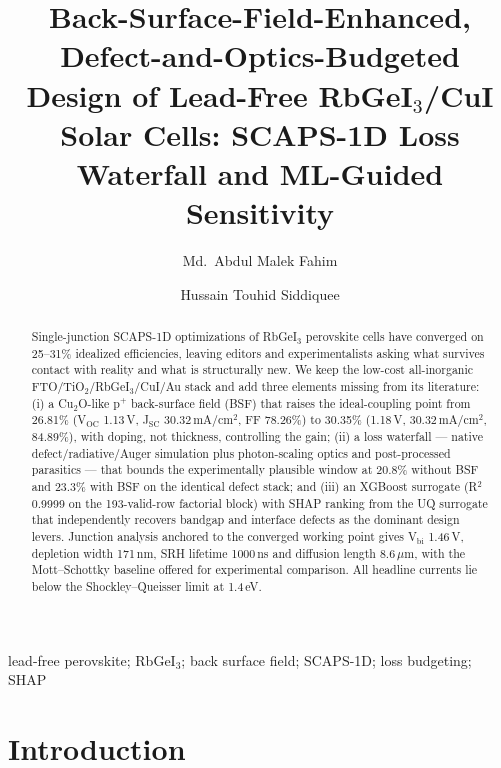 \documentclass[review]{elsarticle}
\begin{document}
\begin{frontmatter}
\title{Back-Surface-Field-Enhanced, Defect-and-Optics-Budgeted Design of Lead-Free RbGeI$_{3}$/CuI Solar Cells: SCAPS-1D Loss Waterfall and ML-Guided Sensitivity}
\author[lus]{Md.\ Abdul Malek Fahim}
\author[lus]{Hussain Touhid Siddiquee}
\address[lus]{Department of Electrical and Electronic Engineering, Leading University, Sylhet, Bangladesh}
\begin{abstract}
Single-junction SCAPS-1D optimizations of RbGeI$_{3}$ perovskite cells have converged on 25--31\% idealized efficiencies, leaving editors and experimentalists asking what survives contact with reality and what is structurally new. We keep the low-cost all-inorganic FTO/TiO$_{2}$/RbGeI$_{3}$/CuI/Au stack and add three elements missing from its literature: (i) a Cu$_{2}$O-like p$^{+}$ back-surface field (BSF) that raises the ideal-coupling point from 26.81\% (V$_{\mathrm{OC}}$ 1.13\,V, J$_{\mathrm{SC}}$ 30.32\,mA/cm$^{2}$, FF 78.26\%) to 30.35\% (1.18\,V, 30.32\,mA/cm$^{2}$, 84.89\%), with doping, not thickness, controlling the gain; (ii) a loss waterfall --- native defect/radiative/Auger simulation plus photon-scaling optics and post-processed parasitics --- that bounds the experimentally plausible window at 20.8\% without BSF and 23.3\% with BSF on the identical defect stack; and (iii) an XGBoost surrogate (R$^{2}$ 0.9999 on the 193-valid-row factorial block) with SHAP ranking from the UQ surrogate that independently recovers bandgap and interface defects as the dominant design levers. Junction analysis anchored to the converged working point gives V$_{\mathrm{bi}}$ 1.46\,V, depletion width 171\,nm, SRH lifetime 1000\,ns and diffusion length 8.6\,$\mu$m, with the Mott--Schottky baseline offered for experimental comparison. All headline currents lie below the Shockley--Queisser limit at 1.4\,eV.
\end{abstract}
\begin{keyword}
lead-free perovskite; RbGeI$_{3}$; back surface field; SCAPS-1D; loss budgeting; SHAP
\end{keyword}
\end{frontmatter}

\section{Introduction}
\end{document}
